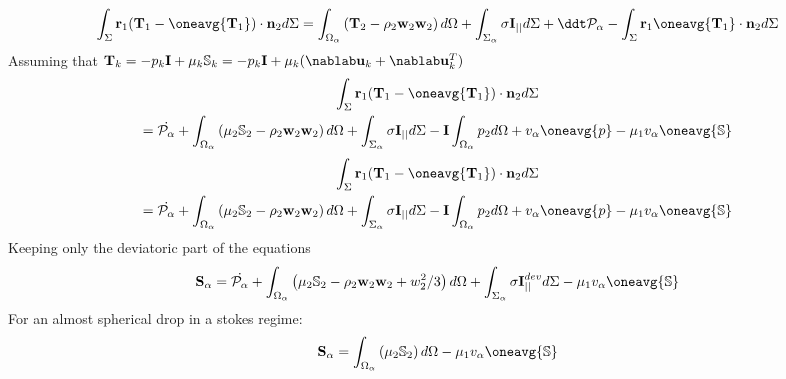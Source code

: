\begin{equation}
    \int_{\Sigma}\textbf{r}_1 (\textbf{T}_1  -  \oneavg{\textbf{T}_1}) \cdot \textbf{n}_2 d\Sigma
    = \int_{\Omega_\alpha} \left(
        \mathbf{T}_2
        - \rho_2  \textbf{w}_2 \textbf{w}_2 
    \right) d\Omega
     + \int_{\Sigma_\alpha} 
     \sigma \textbf{I}_{||}
    d\Sigma
    + \ddt \mathcal{P}_\alpha
    -\int_{\Sigma}\textbf{r}_1   \oneavg{\textbf{T}_1} \cdot \textbf{n}_2 d\Sigma
\end{equation}
Assuming that $\textbf{T}_k = - p_k \textbf{I} + \mu_k \mathbb{S}_k  = -p_k \textbf{I} + \mu_k (\nablab \textbf{u}_k + \nablab \textbf{u}_k^T )$ 
\begin{multline}
    \int_{\Sigma}\textbf{r}_1 (\textbf{T}_1  -  \oneavg{\textbf{T}_1}) \cdot \textbf{n}_2 d\Sigma
    \\= \dot{ \mathcal{P}_\alpha}
    + \int_{\Omega_\alpha} \left(
        \mu_2\mathbb{S}_2
        - \rho_2  \textbf{w}_2 \textbf{w}_2 
    \right) d\Omega
     + \int_{\Sigma_\alpha} 
     \sigma \textbf{I}_{||}
    d\Sigma
    - \textbf{I} \int_{\Omega_\alpha} p_2 d\Omega
    + v_\alpha \oneavg{p}
    - \mu_1 v_\alpha \oneavg{\mathbb S}
\end{multline}
\begin{multline}
    \int_{\Sigma}\textbf{r}_1 (\textbf{T}_1  -  \oneavg{\textbf{T}_1}) \cdot \textbf{n}_2 d\Sigma
    \\= \dot{ \mathcal{P}_\alpha}
    + \int_{\Omega_\alpha} \left(
        \mu_2\mathbb{S}_2
        - \rho_2  \textbf{w}_2 \textbf{w}_2 
    \right) d\Omega
     + \int_{\Sigma_\alpha} 
     \sigma \textbf{I}_{||}
    d\Sigma
    - \textbf{I} \int_{\Omega_\alpha} p_2 d\Omega
    + v_\alpha \oneavg{p}
    - \mu_1 v_\alpha \oneavg{\mathbb S}
\end{multline}
Keeping only  the deviatoric part of the equations
\begin{equation}
    \textbf{S}_\alpha
    = \dot{ \mathcal{P}_\alpha}
    + \int_{\Omega_\alpha} \left(
        \mu_2\mathbb{S}_2
        - \rho_2  \textbf{w}_2 \textbf{w}_2 + w^2_2/3
    \right) d\Omega
     + \int_{\Sigma_\alpha} 
     \sigma \textbf{I}_{||}^{dev}
    d\Sigma
    - \mu_1 v_\alpha \oneavg{\mathbb S}
\end{equation}
For an almost spherical drop in a stokes regime: 
\begin{equation}
    \textbf{S}_\alpha
    = 
    \int_{\Omega_\alpha} \left(
        \mu_2\mathbb{S}_2
    \right) d\Omega
    - \mu_1 v_\alpha \oneavg{\mathbb S}
\end{equation}
 
